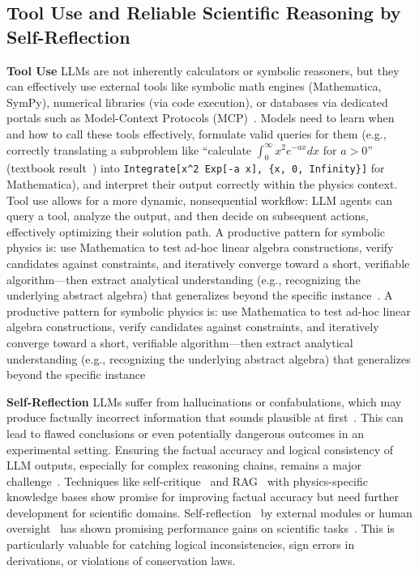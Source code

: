 \subsection{Tool Use and Reliable Scientific Reasoning by Self-Reflection}
\label{sec:tool_integration_reliability}

\textbf{Tool Use} LLMs are not inherently calculators or symbolic reasoners, but they can effectively use external tools like symbolic math engines (Mathematica, SymPy), numerical libraries (via code execution), or databases via dedicated portals such as Model-Context Protocols (MCP)~\cite{Shen2023HuggingGPT,Patil2023Gorilla,Anthropic2024Introducing,PathintegralInstitute2025Mcpscience}. Models need to learn when and how to call these tools effectively, formulate valid queries for them (e.g., correctly translating a subproblem like ``calculate $\int_0^\infty x^2 e^{-ax} dx$ for $a>0$'' (textbook result~\cite{Arfken2013Mathematical}) into \verb|Integrate[x^2 Exp[-a x], {x, 0, Infinity}]| for Mathematica), and interpret their output correctly within the physics context.
Tool use allows for a more dynamic, nonsequential workflow: LLM agents can query a tool, analyze the output, and then decide on subsequent actions, effectively optimizing their solution path.
A productive pattern for symbolic physics is: use Mathematica to test ad-hoc linear algebra constructions, verify candidates against constraints, and iteratively converge toward a short, verifiable algorithm---then extract analytical understanding (e.g., recognizing the underlying abstract algebra) that generalizes beyond the specific instance~\cite{Cirac2021Matrix}.
A productive pattern for symbolic physics is: use Mathematica to test ad-hoc linear algebra constructions, verify candidates against constraints, and iteratively converge toward a short, verifiable algorithm---then extract analytical understanding (e.g., recognizing the underlying abstract algebra) that generalizes beyond the specific instance~\cite{Cirac2021Matrix}

\textbf{Self-Reflection} LLMs suffer from hallucinations or confabulations, which may produce factually incorrect information that sounds plausible at first~\cite{Zhang2023Sirens,Bottou2025Fiction}. This can lead to flawed conclusions or even potentially dangerous outcomes in an experimental setting. Ensuring the factual accuracy and logical consistency of LLM outputs, especially for complex reasoning chains, remains a major challenge~\cite{Lightman2023Lets}. Techniques like self-critique~\cite{Saunders2022SelfCritiquing} and RAG~\cite{Lewis2020Retrievalaugmented} with physics-specific knowledge bases show promise for improving factual accuracy but need further development for scientific domains.
Self-reflection~\cite{Madaan2023SelfRefine,Shinn2023Reflexion,Saunders2022SelfCritiquing} by external modules or human oversight~\cite{Lightman2023Lets,McAleese2024LLM,Kirchner2024ProverVerifier} has shown promising performance gains on scientific tasks~\cite{Lightman2023Lets,Wang2022SelfConsistency}. This is particularly valuable for catching logical inconsistencies, sign errors in derivations, or violations of conservation laws.

